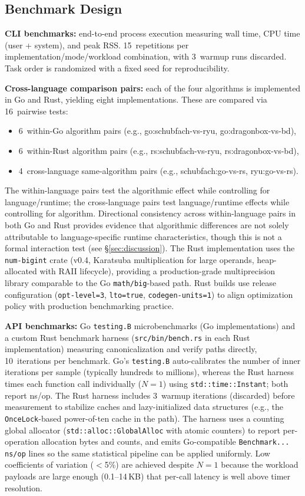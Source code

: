 \subsection{Benchmark Design}

\textbf{CLI benchmarks:} end-to-end process execution measuring wall
time, CPU time (user + system), and peak RSS.  15~repetitions per
implementation/mode/workload combination, with 3~warmup runs discarded.
Task order is randomized with a fixed seed for reproducibility.

\textbf{Cross-language comparison pairs:} each of the four algorithms is
implemented in Go and Rust, yielding eight implementations.  These are
compared via 16~pairwise tests:
\begin{itemize}
\item 6~within-Go algorithm pairs (e.g., go:schubfach-vs-ryu,
      go:dragonbox-vs-bd),
\item 6~within-Rust algorithm pairs (e.g., rs:schubfach-vs-ryu,
      rs:dragonbox-vs-bd),
\item 4~cross-language same-algorithm pairs (e.g., schubfach:go-vs-rs,
      ryu:go-vs-rs).
\end{itemize}
The within-language pairs test the algorithmic effect while controlling
for language/runtime; the cross-language pairs test language/runtime
effects while controlling for algorithm.  Directional consistency across
within-language pairs in both Go and Rust provides evidence that
algorithmic differences are not solely attributable to language-specific
runtime characteristics, though this is not a
formal interaction test (see \S\ref{sec:discussion}).  The Rust
\burgerdybvig implementation uses the \texttt{num-bigint} crate (v0.4,
Karatsuba multiplication for large operands, heap-allocated with RAII
lifecycle), providing a production-grade multiprecision library
comparable to the Go \texttt{math/big}-based path.  Rust builds use release configuration
(\texttt{opt-level=3}, \texttt{lto=true}, \texttt{codegen-units=1}) to
align optimization policy with production benchmarking practice.

\textbf{API benchmarks:} Go \texttt{testing.B} microbenchmarks (Go
implementations) and a custom Rust benchmark harness
(\texttt{src/bin/bench.rs} in each Rust implementation) measuring
canonicalization and verify paths directly, 10~iterations per benchmark.
Go's \texttt{testing.B} auto-calibrates the number of inner iterations
per sample (typically hundreds to millions), whereas the Rust harness
times each function call individually ($N{=}1$) using
\texttt{std::time::Instant}; both report ns/op.  The Rust harness
includes 3~warmup iterations (discarded) before measurement to stabilize
caches and lazy-initialized data structures (e.g., the
\texttt{OnceLock}-based power-of-ten cache in the \burgerdybvig path).
The harness uses a counting global allocator
(\texttt{std::alloc::GlobalAlloc} with atomic counters) to report
per-operation allocation bytes and counts, and emits Go-compatible
\texttt{Benchmark... ns/op} lines so the same statistical pipeline can
be applied uniformly.  Low coefficients of variation ($<$5\%) are
achieved despite $N{=}1$ because the workload payloads are large enough
(0.1--14\,KB) that per-call latency is well above timer resolution.

